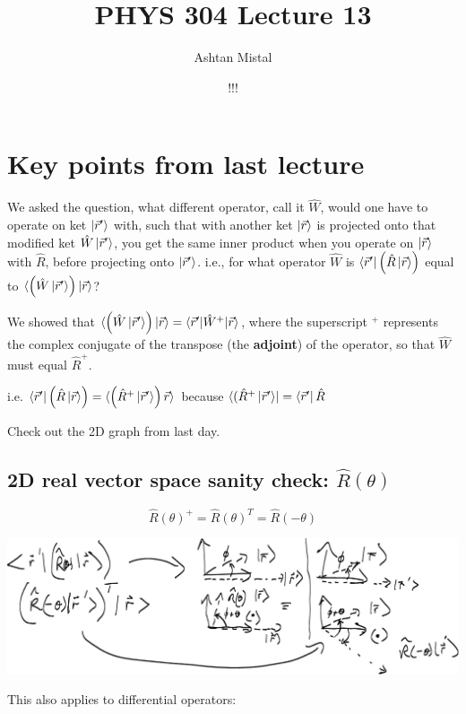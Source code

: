 \documentclass{article}
\title{PHYS 304 Lecture 13}
\author{Ashtan Mistal}
\date{!!!}
\begin{document}
\ifstandalone
\maketitle
\fi

\graphicspath{{./Lecture13/}}

\section{Key points from last lecture}

We asked the question, what different operator, call it $\hat{W}$, would one have to operate on ket $\ket{\vec{r}'}$ with, such that with another ket $\ket{\vec{r}}$ is projected onto that modified ket $\hat{W} \ket{\vec{r}'}$, you get the same inner product when you operate on $\ket{\vec{r}}$ with $\hat{R}$, before projecting onto $\ket{\vec{r}'}$. i.e., for what operator $\hat{W}$ is $\bra{\vec{r}'} \left( \hat{R} \ket{\vec{r}} \right)$ equal to $\braket{ \left( \hat{W} \ket{\vec{r}'} \right) | \vec{r}}$?

We showed that $\braket{ \left( \hat{W} \ket{\vec{r}'} \right) | \vec{r}} = \braket{\vec{r}'|\hat{W}^+|\vec{r}}$, where the superscript $^+$ represents the complex conjugate of the transpose (the \textbf{adjoint}) of the operator, so that $\hat{W}$ must equal $\hat{R}^+$.

i.e. $\bra{\vec{r}'} \left( \hat{R} \ket{\vec r} \right) = \braket{ \left( \hat{R}^+ \ket{\vec{r}'} \right) \vec{r}}$ because $\bra{(\hat{R}^+ \ket{\vec{r}'}} = \bra{\vec{r}'}\hat{R}$

Check out the 2D graph from last day. 

\subsection*{2D real vector space sanity check: $\hat{R}(\theta)$}

$$\hat{R} (\theta)^+ = \hat{R} (\theta)^T = \hat{R}(- \theta)$$


\includegraphics[width = 0.9 \textwidth]{Lecture13/1.png}

This also applies to differential operators:
\end{document}

